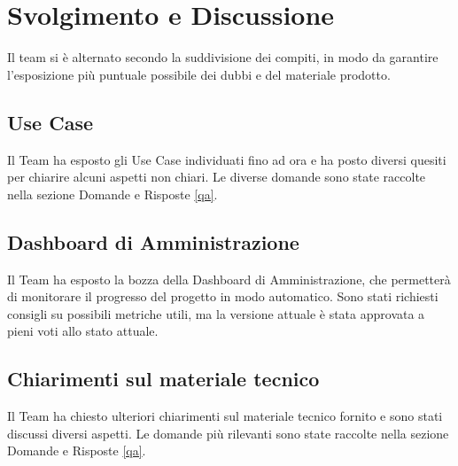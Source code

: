 \documentclass[a4paper,12pt]{article}
\begin{document}
\vspace{0.5cm}

\section{Svolgimento e Discussione}
Il team si è alternato secondo la suddivisione dei compiti, in modo da garantire l'esposizione più puntuale possibile dei dubbi e del materiale prodotto.

\subsection{Use Case}
Il Team ha esposto gli Use Case individuati fino ad ora e ha posto diversi quesiti per chiarire alcuni aspetti non chiari. Le diverse domande sono state raccolte nella sezione Domande e Risposte \ref{qa}.

\subsection{Dashboard di Amministrazione}
Il Team ha esposto la bozza della Dashboard di Amministrazione, che permetterà di monitorare il progresso del progetto in modo automatico. Sono stati richiesti consigli su possibili metriche utili, ma la versione attuale è stata approvata a pieni voti allo stato attuale.
\subsection{Chiarimenti sul materiale tecnico}
Il Team ha chiesto ulteriori chiarimenti sul materiale tecnico fornito e sono stati discussi diversi aspetti. Le domande più rilevanti sono state raccolte nella sezione Domande e Risposte \ref{qa}.
\end{document}
